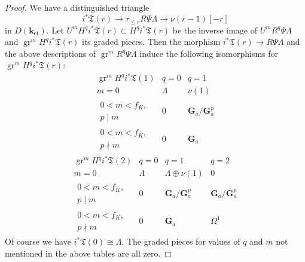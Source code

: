 \documentclass{amsart}
\theoremstyle{remark}
\numberwithin{equation}{subsection}
\newcommand{\et}{\mathrm{et}}
\newcommand{\Ga}{\mathbf{G}_{a}}
\newcommand{\alg}[1]{\mathbf{#1}}
\DeclareMathOperator{\gr}{gr}
\begin{document}
\begin{proof}
	We have a distinguished triangle
		\[
				i^{\ast} \mathfrak{T}(r)
			\to
				\tau_{\le r} R \Psi \Lambda
			\to
				\nu(r - 1)[-r]
		\]
	in $D(\alg{k}_{\et})$.
	Let $U^{m} H^{q} i^{\ast} \mathfrak{T}(r) \subset H^{q} i^{\ast} \mathfrak{T}(r)$ be
	the inverse image of $U^{m} R^{q} \Psi \Lambda$
	and $\gr^{m} H^{q} i^{\ast} \mathfrak{T}(r)$ its graded pieces.
	Then the morphism $i^{\ast} \mathfrak{T}(r) \to R \Psi \Lambda$
	and the above descriptions of $\gr^{m} R^{q} \Psi \Lambda$ induce
	the following isomorphisms for $\gr^{m} H^{q} i^{\ast} \mathfrak{T}(r)$:
		\[
			\begin{array}{c|cc}
					\gr^{m} H^{q} i^{\ast} \mathfrak{T}(1)
				&
					q = 0
				&
					q = 1
				\\ \hline
					m = 0
				&
					\Lambda
				&
					\nu(1)
				\\
					\begin{array}{c}
						0 < m < f_{K},\\ p \mid m
					\end{array}
				&
					0
				&
					\Ga / \Ga^{p}
				\\
					\begin{array}{c}
						0 < m < f_{K},\\ p \nmid m
					\end{array}
				&
					0
				&
					\Ga
			\end{array}
		\]
		\[
			\begin{array}{c|ccc}
					\gr^{m} H^{q} i^{\ast} \mathfrak{T}(2)
				&
					q = 0
				&
					q = 1
				&
					q = 2
				\\ \hline
					m = 0
				&
					\Lambda
				&
					\Lambda \oplus \nu(1)
				&
					0
				\\
					\begin{array}{c}
						0 < m < f_{K},\\ p \mid m
					\end{array}
				&
					0
				&
					\Ga / \Ga^{p}
				&
					\Ga / \Ga^{p}
				\\
					\begin{array}{c}
						0 < m < f_{K},\\ p \nmid m
					\end{array}
				&
					0
				&
					\Ga
				&
					\Omega^{1}
			\end{array}
		\]
	Of course we have $i^{\ast} \mathfrak{T}(0) \cong \Lambda$.
	The graded pieces for values of $q$ and $m$ not mentioned in the above tables are all zero.
	

\end{proof}
\end{document}
